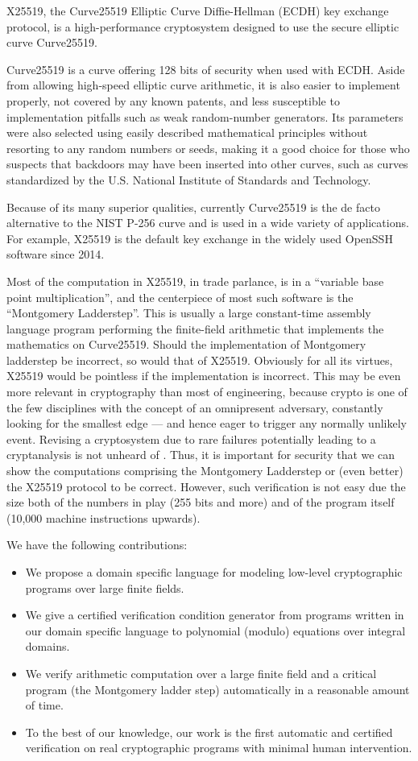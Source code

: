 
X25519, the Curve25519 Elliptic Curve Diffie-Hellman (ECDH) key exchange
protocol, is a high-performance cryptosystem designed to use the
secure elliptic curve Curve25519.

Curve25519 is a curve offering 128 bits of security when used with
ECDH. Aside from allowing high-speed elliptic curve arithmetic, it is
also easier to implement properly, not covered by any known patents,
and less susceptible to implementation pitfalls such as weak
random-number generators. Its parameters were also selected using
easily described mathematical principles without resorting to any
random numbers or seeds, making it a good choice for those who
suspects that backdoors may have been inserted into other curves, such
as curves standardized by the U.S. National Institute of Standards and
Technology.

Because of its many superior qualities, currently Curve25519 is the de
facto alternative to the NIST P-256 curve and is used in a wide
variety of applications. For example, X25519 is the default key
exchange in the widely used OpenSSH software since 2014.

Most of the computation in X25519, in trade parlance, is in a
``variable base point multiplication'', and the centerpiece of most
such software is the ``Montgomery Ladderstep''. This is usually a
large constant-time assembly language program performing the
finite-field arithmetic that implements the mathematics on Curve25519.
Should the implementation of Montgomery ladderstep be incorrect, so
would that of X25519. Obviously for all its virtues, X25519 would be
pointless if the implementation is incorrect. This may be even more
relevant in cryptography than most of engineering, because crypto is
one of the few disciplines with the concept of an omnipresent
adversary, constantly looking for the smallest edge --- and hence
eager to trigger any normally unlikely event. Revising a cryptosystem
due to rare failures potentially leading to a cryptanalysis is not
unheard of .
Thus, it is important for security that we can show the computations
comprising the Montgomery Ladderstep or (even better) the X25519
protocol to be correct. However, such verification is not easy due
the size both of the numbers in play (255 bits and more) and of the
program itself (10,000 machine instructions upwards).


We have the following contributions:
\begin{itemize}
\item We propose a domain specific language for modeling low-level
  cryptographic programs over large finite fields.
\item We give a certified verification condition generator from
  programs written in our domain specific language to polynomial
  (modulo) equations over integral domains.
\item We verify arithmetic computation over a large finite field and a
  critical program (the Montgomery ladder step) automatically in a
  reasonable amount of time.  
\item To the best of our knowledge, our work is the first automatic
  and certified verification on real cryptographic programs with
  minimal human intervention.
\end{itemize}
